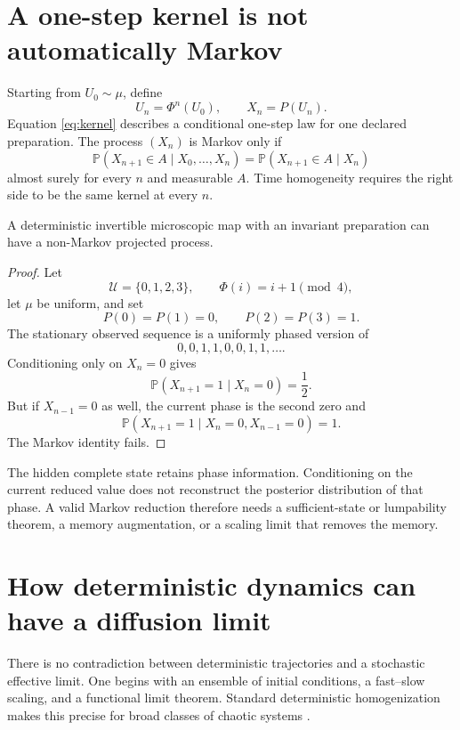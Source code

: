 \documentclass[11pt]{article}
\newcommand{\Uu}{\mathcal U}
\newcommand{\bbP}{\mathbb P}
\begin{document}
\section{A one-step kernel is not automatically Markov}

Starting from \(U_0\sim\mu\), define
\[
U_n=\Phi^n(U_0),
\qquad
X_n=P(U_n).
\]
Equation \eqref{eq:kernel} describes a conditional one-step law for one
declared preparation. The process \((X_n)\) is Markov only if
\[
\bbP(X_{n+1}\in A\mid X_0,\ldots,X_n)
=
\bbP(X_{n+1}\in A\mid X_n)
\]
almost surely for every \(n\) and measurable \(A\). Time homogeneity requires
the right side to be the same kernel at every \(n\).

\begin{proposition}
\label{prop:not-markov}
A deterministic invertible microscopic map with an invariant preparation can
have a non-Markov projected process.
\end{proposition}

\begin{proof}
Let
\[
\Uu=\{0,1,2,3\},
\qquad
\Phi(i)=i+1\pmod 4,
\]
let \(\mu\) be uniform, and set
\[
P(0)=P(1)=0,
\qquad
P(2)=P(3)=1.
\]
The stationary observed sequence is a uniformly phased version of
\[
0,0,1,1,0,0,1,1,\ldots.
\]
Conditioning only on \(X_n=0\) gives
\[
\bbP(X_{n+1}=1\mid X_n=0)=\frac12.
\]
But if \(X_{n-1}=0\) as well, the current phase is the second zero and
\[
\bbP(X_{n+1}=1\mid X_n=0,X_{n-1}=0)=1.
\]
The Markov identity fails.
\end{proof}

The hidden complete state retains phase information. Conditioning on the
current reduced value does not reconstruct the posterior distribution of
that phase. A valid Markov reduction therefore needs a sufficient-state or
lumpability theorem, a memory augmentation, or a scaling limit that removes
the memory.

\section{How deterministic dynamics can have a diffusion limit}

There is no contradiction between deterministic trajectories and a
stochastic effective limit. One begins with an ensemble of initial
conditions, a fast--slow scaling, and a functional limit theorem. Standard
deterministic homogenization makes this precise for broad classes of chaotic
systems \cite{ChevyrevEtAl2022}.
\end{document}
